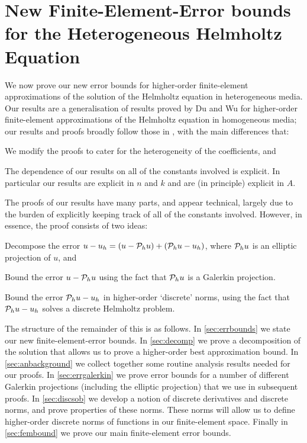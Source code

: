 
\section{New Finite-Element-Error bounds for the Heterogeneous Helmholtz Equation}\label{sec:fem}

We now prove our new error bounds for higher-order finite-element approximations of the solution of the Helmholtz equation in heterogeneous media. Our results are a generalisation of results proved by Du and Wu \cite{DuWu:15} for higher-order finite-element approximations of the Helmholtz equation in homogeneous media; our results and proofs broadly follow those in \cite{DuWu:15}, with the main differences that:
\ben
\item We modify the proofs to cater for the heterogeneity of the coefficients, and
\item The dependence of our results on all of the constants involved is explicit.
\een
  In particular our results are explicit in $n$ and $k$ and are (in principle) explicit in $A$.

The proofs of our results have many parts, and appear technical, largely due to the burden of explicitly keeping track of all of the constants involved. However, in essence, the proof consists of two ideas:
\ben
\item Decompose the error $u-u_{h} = (u - \mathcal P_{h} u) + (\mathcal P_{h} u - u_{h})$, where $\mathcal P_{h} u$ is an elliptic projection of $u$, and
\item Bound the error $u - \mathcal P_{h} u$ using the fact that $\mathcal P_{h} u$ is a Galerkin projection.
\item Bound the error $\mathcal P_{h} u - u_{h}$ in higher-order `discrete' norms, using the fact that $\mathcal P_{h} u - u_{h}$ solves a discrete Helmholtz problem.
\een

The structure of the remainder of this  is as follows. In \cref{sec:errbounds} we state our new finite-element-error bounds. In \cref{sec:decomp} we prove a decomposition of the solution that allows us to prove a higher-order best approximation bound. In \cref{sec:anbackground} we collect together some routine analysis results needed for our proofs. In \cref{sec:errgalerkin} we prove error bounds for a number of different Galerkin projections (including the elliptic projection) that we use in subsequent proofs. In \cref{sec:discsob} we develop a notion of discrete derivatives and discrete norms, and prove properties of these norms. These norms will allow us to define higher-order discrete norms of functions in our finite-element space. Finally in \cref{sec:fembound} we prove our main finite-element error bounds.



